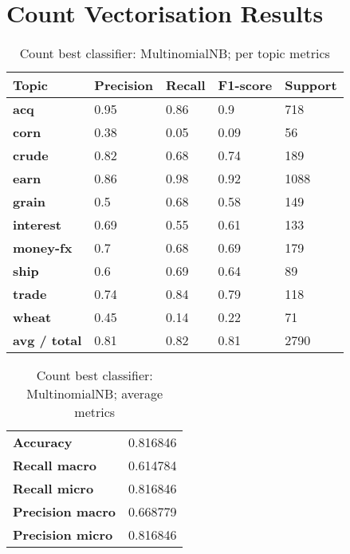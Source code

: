 \documentclass{article}
\begin{document}
\appendix

\section{Count Vectorisation Results}

\begin{table}[h!]
\begin{tabular}{l|llll}
\textbf{Topic}       & \textbf{Precision} & \textbf{Recall} & \textbf{F1-score} & \textbf{Support} \\ \hline
\textbf{acq}         & 0.95               & 0.86            & 0.9               & 718              \\
\textbf{corn}        & 0.38               & 0.05            & 0.09              & 56               \\
\textbf{crude}       & 0.82               & 0.68            & 0.74              & 189              \\
\textbf{earn}        & 0.86               & 0.98            & 0.92              & 1088             \\
\textbf{grain}       & 0.5                & 0.68            & 0.58              & 149              \\
\textbf{interest}    & 0.69               & 0.55            & 0.61              & 133              \\
\textbf{money-fx}    & 0.7                & 0.68            & 0.69              & 179              \\
\textbf{ship}        & 0.6                & 0.69            & 0.64              & 89               \\
\textbf{trade}       & 0.74               & 0.84            & 0.79              & 118              \\
\textbf{wheat}       & 0.45               & 0.14            & 0.22              & 71               \\
\textbf{avg / total} & 0.81               & 0.82            & 0.81              & 2790            
\end{tabular}
\caption {Count best classifier: MultinomialNB; per topic metrics}
\end{table}

\begin{table}[h!]
\begin{tabular}{l|l}
\textbf{Accuracy}        & 0.816846 \\
\textbf{Recall macro}    & 0.614784 \\
\textbf{Recall micro}    & 0.816846 \\
\textbf{Precision macro} & 0.668779 \\
\textbf{Precision micro} & 0.816846
\end{tabular}
\caption {Count best classifier: MultinomialNB; average metrics}
\end{table}
\end{document}
